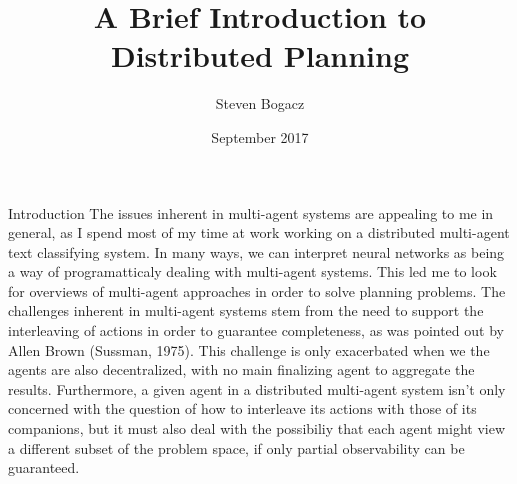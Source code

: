 \documentclass{article}
\title{A Brief Introduction to Distributed Planning}
\author{Steven Bogacz}
\date{September 2017}
\begin{document}
\maketitle
\begin{section}{Introduction}
	The issues inherent in multi-agent systems are appealing to me in general, as I spend most
	of my time at work working on a distributed multi-agent text classifying system. In many
	ways, we can interpret neural networks as being a way of programatticaly dealing with multi-agent
	systems. This led me to look for overviews of multi-agent approaches in order to solve planning
	problems. The challenges inherent in multi-agent systems stem from the need to support the 
	interleaving of actions in order to guarantee completeness, as was pointed out by Allen Brown (Sussman, 1975).
	This challenge is only exacerbated when we the agents are also decentralized, with no main finalizing agent
	to aggregate the results. Furthermore, a given agent in a distributed multi-agent system 
	isn't only concerned with the question of how to interleave its actions with those of its 
	companions, but it must also deal with the possibiliy that each agent might view a different subset of
	the problem space, if only partial observability can be guaranteed.\cite{bonisoli} 
\end{section}
\end{document}
